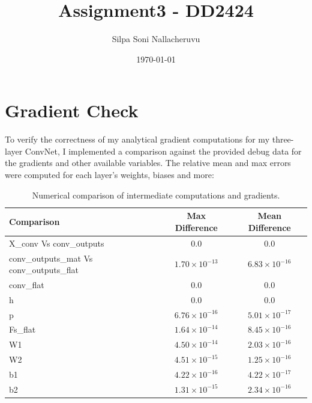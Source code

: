 \documentclass[11pt]{article}
\begin{document}
\title{Assignment3 - DD2424}
\author{Silpa Soni Nallacheruvu}
\date{\today}
\maketitle

\section*{Gradient Check}

To verify the correctness of my analytical gradient computations for my three-layer ConvNet, I implemented a comparison against the provided debug data for the gradients and other available variables. The relative mean and max errors were computed for each layer's weights, biases and more:
\begin{table}[h!]
  \centering
  \begin{tabular}{|l|c|c|}
  \hline
  \textbf{Comparison} & \textbf{Max Difference} & \textbf{Mean Difference} \\
  \hline
  X\_conv Vs conv\_outputs           & $0.0$                        & $0.0$ \\
  conv\_outputs\_mat Vs conv\_outputs\_flat & $1.70 \times 10^{-13}$       & $6.83 \times 10^{-16}$ \\
  conv\_flat                         & $0.0$                        & $0.0$  \\
  h                                  & $0.0$                        & $0.0$  \\
  p                                  & $6.76 \times 10^{-16}$       & $5.01 \times 10^{-17}$ \\
  Fs\_flat                           & $1.64 \times 10^{-14}$       & $8.45 \times 10^{-16}$ \\
  W1                                 & $4.50 \times 10^{-14}$       & $2.03 \times 10^{-16}$ \\
  W2                                 & $4.51 \times 10^{-15}$       & $1.25 \times 10^{-16}$ \\
  b1                                 & $4.22 \times 10^{-16}$       & $4.22 \times 10^{-17}$ \\
  b2                                 & $1.31 \times 10^{-15}$       & $2.34 \times 10^{-16}$ \\
  \hline
  \end{tabular}
  \caption{Numerical comparison of intermediate computations and gradients.}
  \end{table}
\end{document}
